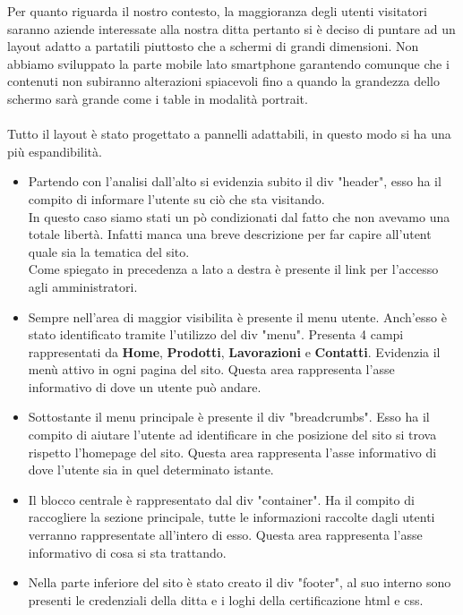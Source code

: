 \documentclass[11pt]{article}
\begin{document}
Per quanto riguarda il nostro contesto, la maggioranza degli utenti visitatori saranno aziende interessate alla nostra ditta pertanto si è deciso di puntare ad un layout adatto a partatili piuttosto che a schermi di grandi dimensioni. Non abbiamo sviluppato la parte mobile lato smartphone garantendo comunque che i contenuti non subiranno alterazioni spiacevoli fino a quando la grandezza dello schermo sarà grande come i table in modalità portrait. 
\\
\\
Tutto il layout è stato progettato a pannelli adattabili, in questo modo si ha una più espandibilità.
\begin{itemize}
	\item Partendo con l'analisi dall'alto si evidenzia subito il div "header", esso ha il compito di informare l'utente su ciò che sta visitando.
	\\In questo caso siamo stati un pò condizionati dal fatto che non avevamo una totale libertà. Infatti manca una breve descrizione per far capire all'utent quale sia la tematica del sito.
	\\Come spiegato in precedenza a lato a destra è presente il link per l'accesso agli amministratori.
	\item Sempre nell'area di maggior visibilita è presente il menu utente. Anch'esso è stato identificato tramite l'utilizzo del div "menu". Presenta 4 campi rappresentati da \textbf{Home}, \textbf{Prodotti}, \textbf{Lavorazioni} e \textbf{Contatti}. Evidenzia il menù attivo in ogni pagina del sito. Questa area rappresenta l'asse informativo di dove un utente può andare.
	\item Sottostante il menu principale è presente il div "breadcrumbs". Esso ha il compito di aiutare l'utente ad identificare in che posizione del sito si trova rispetto l’homepage del sito. Questa area rappresenta l'asse informativo di dove l'utente sia in quel determinato istante.
	\item Il blocco centrale è rappresentato dal div "container". Ha il compito di raccogliere la sezione principale, tutte le informazioni raccolte dagli utenti verranno rappresentate all'intero di esso. Questa area rappresenta l'asse informativo di cosa si sta trattando.
	\item Nella parte inferiore del sito è stato creato il div "footer", al suo interno sono presenti le credenziali della ditta e i loghi della certificazione html e css.
\end{itemize}
\end{document}
